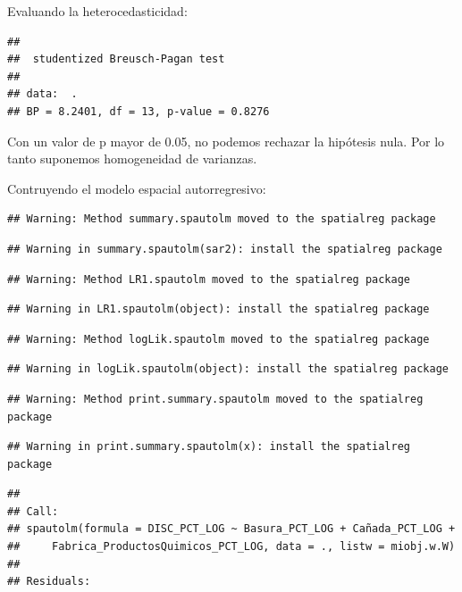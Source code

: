 \documentclass[11pt,]{article}
\begin{document}
Evaluando la heterocedasticidad:

\begin{verbatim}
## 
##  studentized Breusch-Pagan test
## 
## data:  .
## BP = 8.2401, df = 13, p-value = 0.8276
\end{verbatim}

Con un valor de p mayor de 0.05, no podemos rechazar la hipótesis nula.
Por lo tanto suponemos homogeneidad de varianzas.

Contruyendo el modelo espacial autorregresivo:

\begin{verbatim}
## Warning: Method summary.spautolm moved to the spatialreg package
\end{verbatim}

\begin{verbatim}
## Warning in summary.spautolm(sar2): install the spatialreg package
\end{verbatim}

\begin{verbatim}
## Warning: Method LR1.spautolm moved to the spatialreg package
\end{verbatim}

\begin{verbatim}
## Warning in LR1.spautolm(object): install the spatialreg package
\end{verbatim}

\begin{verbatim}
## Warning: Method logLik.spautolm moved to the spatialreg package
\end{verbatim}

\begin{verbatim}
## Warning in logLik.spautolm(object): install the spatialreg package
\end{verbatim}

\begin{verbatim}
## Warning: Method print.summary.spautolm moved to the spatialreg package
\end{verbatim}

\begin{verbatim}
## Warning in print.summary.spautolm(x): install the spatialreg package
\end{verbatim}

\begin{verbatim}
## 
## Call: 
## spautolm(formula = DISC_PCT_LOG ~ Basura_PCT_LOG + Cañada_PCT_LOG + 
##     Fabrica_ProductosQuimicos_PCT_LOG, data = ., listw = miobj.w.W)
## 
## Residuals:
\end{verbatim}
\end{document}
